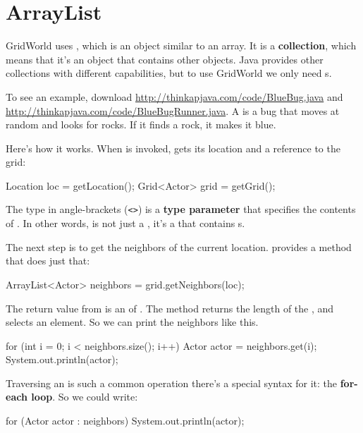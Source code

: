 \section{ArrayList}

GridWorld uses , which is an object similar to an array.
It is a {\bf collection}, which means that it's an object that contains other objects.
Java provides other collections with different capabilities, but to use GridWorld we only need s.

To see an example, download \url{http://thinkapjava.com/code/BlueBug.java} and \url{http://thinkapjava.com/code/BlueBugRunner.java}.
A  is a bug that moves at random and looks for rocks.
If it finds a rock, it makes it blue.

Here's how it works.
When  is invoked,  gets its location and a reference to the grid:

\begin{code}
    Location loc = getLocation();
    Grid<Actor> grid = getGrid();
\end{code}

The type in angle-brackets (\verb"<>") is a {\bf type parameter} that specifies the contents of .
In other words,  is not just a , it's a  that contains s.

The next step is to get the neighbors of the current location.
 provides a method that does just that:

\begin{code}
    ArrayList<Actor> neighbors = grid.getNeighbors(loc);
\end{code}

The return value from  is an  of .
The  method returns the length of the , and  selects an element.
So we can print the neighbors like this.

\begin{code}
        for (int i = 0; i < neighbors.size(); i++) {
            Actor actor = neighbors.get(i);
            System.out.println(actor);
        }
\end{code}

Traversing an  is such a common operation there's a special syntax for it: the {\bf for-each loop}.
So we could write:

\begin{code}
        for (Actor actor : neighbors) {
            System.out.println(actor);
        }
\end{code}


